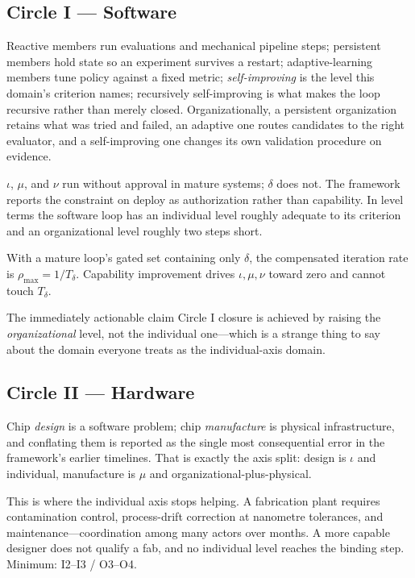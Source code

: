 \documentclass[11pt]{article}
\newcommand{\Td}{\ensuremath{T_\delta}}
\begin{document}
\subsection{Circle I --- Software}

Reactive members run evaluations and mechanical pipeline steps; persistent members hold state so an experiment survives a restart; adaptive-learning members tune policy against a fixed metric; \emph{self-improving} is the level this domain's criterion names; recursively self-improving is what makes the loop recursive rather than merely closed. Organizationally, a persistent organization retains what was tried and failed, an adaptive one routes candidates to the right evaluator, and a self-improving one changes its own validation procedure on evidence.

$\iota$, $\mu$, and $\nu$ run without approval in mature systems; $\delta$ does not. The framework reports the constraint on deploy as authorization rather than capability. In level terms the software loop has an individual level roughly adequate to its criterion and an organizational level roughly two steps short.

With a mature loop's gated set containing only $\delta$, the compensated iteration rate is $\rho_{\max} = 1/\Td$. Capability improvement drives $\iota,\mu,\nu$ toward zero and cannot touch \Td.

\begin{cautionbox}{The immediately actionable claim}
Circle I closure is achieved by raising the \emph{organizational} level, not the individual one---which is a strange thing to say about the domain everyone treats as the individual-axis domain.
\end{cautionbox}

\subsection{Circle II --- Hardware}

Chip \emph{design} is a software problem; chip \emph{manufacture} is physical infrastructure, and conflating them is reported as the single most consequential error in the framework's earlier timelines. That is exactly the axis split: design is $\iota$ and individual, manufacture is $\mu$ and organizational-plus-physical.

This is where the individual axis stops helping. A fabrication plant requires contamination control, process-drift correction at nanometre tolerances, and maintenance---coordination among many actors over months. A more capable designer does not qualify a fab, and no individual level reaches the binding step. Minimum: I2--I3 / O3--O4.
\end{document}
